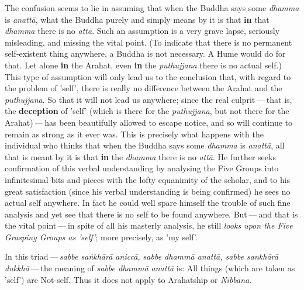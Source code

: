 The confusion seems to lie in assuming that when the Buddha says some
\emph{dhamma} is \emph{anattā}, what the Buddha purely and simply means by it is
that \textbf{in} that \emph{dhamma} there is no \emph{attā}. Such an assumption is a
very grave lapse, seriously misleading, and missing the vital point. (To
indicate that there is no permanent self-existent thing anywhere, a
Buddha is not necessary. A Hume would do for that. Let alone \textbf{in} the
Arahat, even \textbf{in} the \emph{puthujjana} there is no actual self.) This type
of assumption will only lead us to the conclusion that, with regard to
the problem of 'self', there is really no difference between the Arahat
and the \emph{puthujjana}. So that it will not lead us anywhere; since the
real culprit — that is, the \textbf{deception} of 'self' (which is there for
the \emph{puthujjana}, but not there for the Arahat) — has been beautifully
allowed to escape notice, and so will continue to remain as strong as it
ever was. This is precisely what happens with the individual who thinks
that when the Buddha says some \emph{dhamma} is \emph{anattā}, all that is meant
by it is that \textbf{in} the \emph{dhamma} there is no \emph{attā}. He further seeks
confirmation of this verbal understanding by analysing the Five Groups
into infinitesimal bits and pieces with the lofty equanimity of the
scholar, and to his great satisfaction (since his verbal understanding
is being confirmed) he sees no actual self anywhere. In fact he could
well spare himself the trouble of such fine analysis and yet see that
there is no self to be found anywhere. But — and that is the vital point — in spite of all his masterly analysis, he still \emph{looks upon the Five
Grasping Groups as 'self'}; more precisely, as 'my self'.


In this triad — \emph{sabbe saṅkhārā aniccā, sabbe dhammā anattā, sabbe
sankhārā dukkhā} — the meaning of \emph{sabbe dhammā anattā} is: All things
(which are taken as 'self') are Not-self. Thus it does not apply to
Arahatship or \emph{Nibbāna}.


